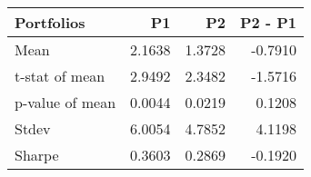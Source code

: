 \begin{tabular}{lrrr}
\toprule
Portfolios & P1 & P2 & P2 - P1 \\
\midrule
Mean & 2.1638 & 1.3728 & -0.7910 \\
t-stat of mean & 2.9492 & 2.3482 & -1.5716 \\
p-value of mean & 0.0044 & 0.0219 & 0.1208 \\
Stdev & 6.0054 & 4.7852 & 4.1198 \\
Sharpe & 0.3603 & 0.2869 & -0.1920 \\
\bottomrule
\end{tabular}
